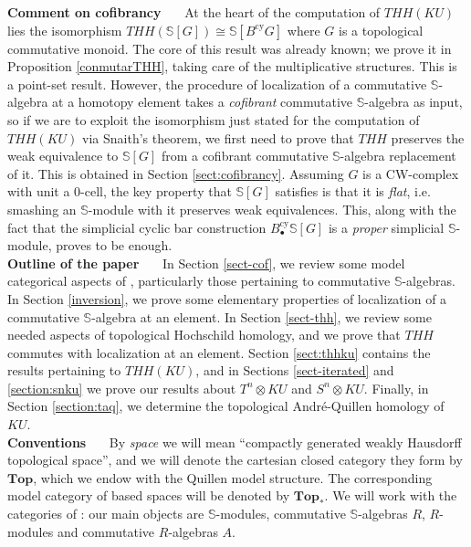 \documentclass[a4paper,11pt]{amsart} %
\theoremstyle{definition} \newtheorem{defn}[equation]{Definition}
\theoremstyle{remark} \newtheorem{notation}[equation]{Notation}
\theoremstyle{plain} \newtheorem{teo}[equation]{Theorem}
\theoremstyle{plain} \newtheorem{lema}[equation]{Lemma}
\theoremstyle{plain} \newtheorem{prop}[equation]{Proposition}
\theoremstyle{plain} \newtheorem{corolario}[equation]{Corollary}
\theoremstyle{remark} \newtheorem{obs}[equation]{Remark}
\theoremstyle{remark} \newtheorem{sideobs}[equation]{Side remark}
\theoremstyle{remark} \newtheorem{ejercicio}[equation]{Exercise}
\theoremstyle{definition} \newtheorem{notn}[equation]{Notation}
\theoremstyle{remark} \newtheorem{ej}[equation]{Example}
\theoremstyle{remark} \newtheorem{contraej}[equation]{Counterexample}
\theoremstyle{plain} \newtheorem{conj}[equation]{Conjecture}
\newcommand{\paragrafo}[1]{\textbf{#1}\ \ \ }
\renewcommand{\1}{\ensuremath{\mathbbm{1}}}
\renewcommand{\S}{\mathbb{S}}
\newcommand{\Top}{\ensuremath{\mathbf{Top}}}
\newcommand{\cy}{\mathrm{cy}}
\numberwithin{equation}{section}
\begin{document}
\paragrafo{Comment on cofibrancy} At the heart of the computation of $THH(KU)$ lies the isomorphism $THH(\S[G])\cong \S[B^\cy G]$ where $G$ is a topological commutative monoid. The core of this result was already known; we prove it in Proposition \ref{conmutarTHH}, taking care of the multiplicative structures. This is a point-set result. However, the procedure of localization of a commutative $\S$-algebra at a homotopy element takes a \emph{cofibrant} commutative $\S$-algebra as input, so if we are to exploit the isomorphism just stated for the computation of $THH(KU)$ via Snaith's theorem, we first need to prove that $THH$ preserves the weak equivalence to $\S[G]$ from a cofibrant commutative $\S$-algebra replacement of it. This is obtained in Section \ref{sect:cofibrancy}. Assuming $G$ is a CW-complex with unit a 0-cell, the key property that $\S[G]$ satisfies is that it is \emph{flat}, i.e. smashing an $\S$-module with it preserves weak equivalences. This, along with the fact that the simplicial cyclic bar construction $B^\cy_\bullet\S[G]$ is a \emph{proper} simplicial $\S$-module, proves to be enough.\\

\paragrafo{Outline of the paper}  In Section \ref{sect-cof}, we review some model categorical aspects of \cite{ekmm}, particularly those pertaining to commutative $\S$-algebras. In Section \ref{inversion}, we prove some elementary properties of localization of a commutative $\S$-algebra at an element. In Section \ref{sect-thh}, we review some needed aspects of topological Hochschild homology, and we prove that $THH$ commutes with localization at an element. Section \ref{sect:thhku} contains the results pertaining to $THH(KU)$, %
%
%
and in Sections \ref{sect-iterated} and \ref{section:snku} we prove our results about $T^n\otimes KU$ and $S^n\otimes KU$. Finally, in Section \ref{section:taq}, we determine the topological André-Quillen homology of $KU$.\\


\paragrafo{Conventions} By \emph{space} we will mean ``compactly generated weakly Hausdorff topological space'', and we will denote the cartesian closed category they form by $\Top$, which we endow with the Quillen model structure. The corresponding model category of based spaces will be denoted by $\Top_*$. 
%
We will work with the categories of \cite{ekmm}: our main objects are $\S$-modules, commutative $\S$-algebras $R$, $R$-modules and commutative $R$-algebras $A$.\\
\end{document}

